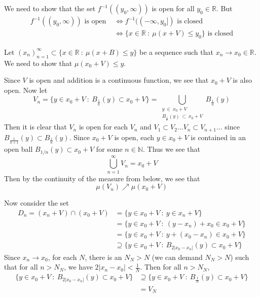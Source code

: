 \documentclass[12pt]{exam}
\theoremstyle{plain} %
\theoremstyle{definition} %
\theoremstyle{remark} %
\begin{document}
\begin{questions}
  \question
  \begin{solution}
    We need to show that the set $f^{-1}((y_0, \infty))$ is open for
    all $y_0 \in \mathbb{R}$. But
    \begin{align*}
      f^{-1}((y_0, \infty)) \textrm{ is open } & \iff f^{-1}((-\infty,
      y_0]) \textrm{ is closed} \\
      &\iff \{ x \in \mathbb{R}  \ : \  \mu(x+V) \le y_0  \}
      \textrm{ is closed}
    \end{align*}

    Let $(x_n)_{n=1}^\infty \subset \{ x \in \mathbb{R}  \ : \
    \mu(x+B) \le y  \}$ be a sequence such that $x_n \to x_0 \in
    \mathbb{R}$. We need to show that $\mu(x_0+V) \le y$.

    Since $V$ is open and addition is a continuous function, we see
    that $x_0+V$ is also open. Now let $$V_n = \{ y \in x_0 + V  \ :
    \ B_{ \frac{1}{n}}(y) \subset x_0+V  \} = \bigcup_{\substack{y
        \ \in \ x_0 + V
    \\ B_{ \frac{1}{n}}(y) \ \subset \ x_0 +V}} B_{ \frac{1}{n}}(y)$$
    Then it is clear that $V_n$ is open for each $V_n$ and $V_1
    \subset V_2 \ldots V_n \subset V_{n+1} \ldots$ since $B_{
    \frac{1}{n+1}}(y) \subset B_{\frac{1}{n}}(y)$. Since
    $x_0+V$ is open, each $y \in x_0+V$ is contained in an open ball
    $B_{1/n}(y) \subset x_0+V$ for some $n \in \mathbb{N}$. Thus we
    see that \[
      \bigcup_{n = 1}^{\infty}V_n = x_0+V
    \]
    Then by the continuity of the
    measure from below, we see that \[
      \mu (V_n) \nearrow \mu(x_0+V)
    \]

    Now consider the set
    \begin{align*}
      D_n = (x_n + V) \cap (x_0 + V) &= \{ y \in x_0 + V  \ : \ y \in
      x_n + V \} \\
      &= \{ y \in x_0 + V  \ : \ (y - x_n)+x_0 \in x_0 + V  \} \\
      &= \{ y \in x_0 + V  \ : \ y + (x_0 - x_n) \in x_0 + V  \} \\
      &\supseteq \{ y \in x_0 + V  \ : \  B_{2|x_0 - x_n|}(y)
      \subset x_0 + V \}
    \end{align*}
    Since $x_n \to x_0$, for each $N$, there is an $N_N> N$ (we can
    demand $N_N > N$) such that
    for all $n > N_N$, we have $2|x_n - x_0| < \frac{1}{N}$. Then for
    all $n > N_N$,
    \begin{align*}
      \{ y \in x_0 + V  \ : \
      B_{2|x_0 - x_n|}(y) \subset x_0 + V \}
      &\supseteq \{ y \in x_0 + V  \ : \  B_{ \frac{1}{N}}(y)
      \subset x_0 + V \} \\
      &= V_N
    \end{align*}


\end{solution}
\end{questions}
\end{document}
